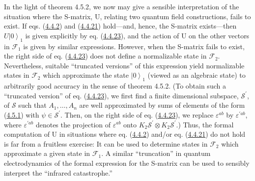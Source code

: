 \documentclass[11pt,a4paper]{article}
\providecommand{\ket}[1]{\left\lvert#1\right\rangle}
\begin{document}
In the light of theorem 4.5.2, we now may give a sensible interpretation of the situation where the S-matrix, U, relating two quantum field constructions, fails to exist. If eqs. (\hyperref[eq:4.4.2]{4.4.2}) and (\hyperref[eq:4.4.21]{4.4.21}) hold---and, hence, the S-matrix exists---then \(U\ket{0}_1\) is given explicitly by eq. (\hyperref[eq:4.4.23]{4.4.23}), and the action of U on the other vectors in \(\mathcal F_1\) is given by similar expressions. However, when the S-matrix fails to exist, the right side of eq. (\hyperref[eq:4.4.23]{4.4.23}) does not define a normalizable state in \(\mathcal F_2\). Nevertheless, suitable ``truncated versions'' of this expression yield normalizable states in \(\mathcal F_2\) which approximate the state \(\ket{0}_1\) (viewed as an algebraic state) to arbitrarily good accuracy in the sense of theorem 4.5.2. (To obtain such a ``truncated version'' of eq. (\hyperref[eq:4.4.23]{4.4.23}), we first find a finite dimensional subspace, \(\mathcal S^{\prime}\), of \(\mathcal{S}\) such that \(A_1,\ldots,A_n\) are well approximated by sums of elements of the form (\hyperref[eq:4.5.1]{4.5.1}) with \(\psi\in\mathcal S^{\prime}\). Then, on the right side of eq. (\hyperref[eq:4.4.23]{4.4.23}), we replace \(\varepsilon^{ab}\) by \(\varepsilon^{'ab}\), where \(\varepsilon^{'ab}\) denotes the projection of \(\varepsilon^{ab}\) onto \(K_2\mathcal S^{\prime}\otimes K_2\mathcal S^{\prime}\).) Thus, the formal computation of U in situations where eq. (\hyperref[eq:4.4.2]{4.4.2}) and/or eq. (\hyperref[eq:4.4.21]{4.4.21}) do not hold is far from a fruitless exercise: It can be used to determine states in \(\mathcal F_2\) which approximate a given state in \(\mathcal F_1\). A similar ``truncation'' in quantum electrodynamics of the formal expression for the S-matrix can be used to sensibly interpret the ``infrared catastrophe.''
\end{document}
